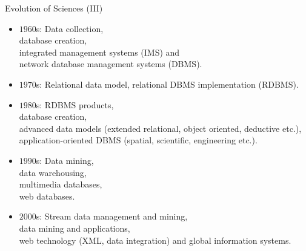 \begin{frame}{Evolution of Sciences (III)}
	\begin{itemize}
		\item $1960$s: Data collection, \\
		\hspace{1cm} database creation, \\
		\hspace{1cm} integrated management systems (IMS) and \\
		\hspace{1cm} network database management systems (DBMS).
		\item $1970$s: Relational data model, relational DBMS implementation 
		(RDBMS).
		\item $1980$s: RDBMS products,\\
		\hspace{1cm} database creation, \\
		\hspace{1cm} advanced data models (extended relational, object 
		oriented, deductive etc.),\\
		\hspace{1cm} application-oriented DBMS (spatial, scientific, 
		engineering etc.).
		\item $1990$s: Data mining,\\
		\hspace{1cm} data warehousing, \\
		\hspace{1cm} multimedia databases,\\
		\hspace{1cm} web databases.
		\item $2000$s: Stream data management and mining,\\
		\hspace{1cm} data mining and applications, \\
		\hspace{1cm} web technology (XML, data integration) and global 
		information systems.
	\end{itemize}
\end{frame}